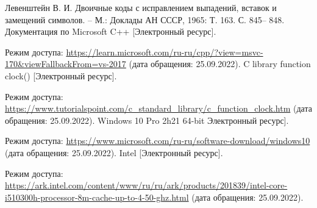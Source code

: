 \renewcommand\bibname{Список используемой литературы} %

\begin{thebibliography}{5}
	Левенштейн В. И. Двоичные коды с исправлением выпадений, вставок и замещений символов. – М.: Доклады АН СССР, 1965: Т. 163. С. 845– 848.
	Документация по Microsoft C++ [Электронный ресурс]. 
	
	Режим доступа: \url{https://learn.microsoft.com/ru-ru/cpp/?view=msvc-170&viewFallbackFrom=vs-2017} (дата обращения: 25.09.2022).
	C library function clock() [Электронный ресурс]. 
	
	Режим доступа: \url{https://www.tutorialspoint.com/c_standard_library/c_function_clock.htm} (дата обращения: 25.09.2022).
	Windows 10 Pro 2h21 64-bit  Электронный ресурс]. 
	
	Режим доступа: \url{https://www.microsoft.com/ru-ru/software-download/windows10} (дата обращения: 25.09.2022).
	Intel [Электронный ресурс]. 
	
	Режим доступа: \url{https://ark.intel.com/content/www/ru/ru/ark/products/201839/intel-core-i510300h-processor-8m-cache-up-to-4-50-ghz.html} (дата обращения: 25.09.2022).
\end{thebibliography}